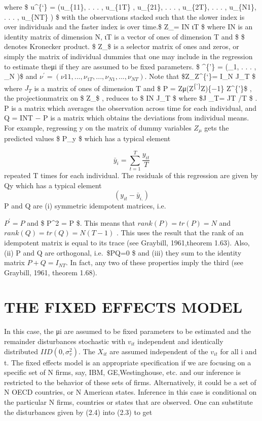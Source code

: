 \documentclass[
]{book}
\begin{document}
where \$ u\^{}\{`\} = (u\_\{11\}, . . . , u\_\{1T\} , u\_\{21\}, . . . , u\_\{2T\}, . . . , u\_\{N1\}, . . . , u\_\{NT\} ) \$ with the observations stacked such that the slower index is over individuals and the faster index is over time.\$ Z\_\mu = IN \otimes ιT \$ where IN is an identity matrix of dimension N, ιT is a vector of ones of dimension T and \$ \otimes \$ denotes Kronecker product. \$ Z\_\mu \$ is a selector matrix of ones and zeros, or simply the matrix of individual dummies that one may include in the regression to estimate theμi if they are assumed to be fixed parameters. \$ \mu\^{}\{'\} = (\mu\_1, . . . , \mu\_N )\$ and \(ν^{'} = (ν11, . . . , ν_{1T} , . . . , ν_{N1}, . . . , ν_{NT} )\). Note that \$Z\_\mu Z\^{}\{`\}\mu = I\_N \otimes J\_T \$ where \(J_T\) is a matrix of ones of dimension T and \$ P = Zμ(Z\textsuperscript{\{'\}}\mu Z\mu)\{−1\} Z\^{}\{'\}\mu \$ , the projectionmatrix on \$ Z\_\mu \$ , reduces to \$ IN \otimes J\_T \$ where \$J \_T= JT /T \$ . P is a matrix which averages the observation across time for each individual, and Q = INT − P is a matrix which obtains the deviations from individual means. For example, regressing y on the matrix of dummy variables \(Z_μ\) gets the predicted values \$ P\_y \$ which has a typical element

\[ \bar y_i = \sum_{t=1}^T \frac{y_{it}}{T}  \] repeated T times for each individual. The residuals of this regression are given by Qy which has a typical element \[ (y_{it} - \bar y _{i.} ) \] P and Q are (i) symmetric idempotent matrices, i.e.

\(P^{'} = P\) and \$ P\^{}2 = P \$. This means that \(rank(P) = tr(P) = N\) and \(rank(Q) = tr(Q) = N(T − 1)\) . This uses the result that the rank of an idempotent matrix is equal to its trace (see Graybill, 1961,theorem 1.63). Also, (ii) P and Q are orthogonal, i.e.~\$PQ=0 \$ and (iii) they sum to the identity matrix \(P + Q = I_{NT}\). In fact, any two of these properties imply the third (see Graybill, 1961, theorem 1.68).

\hypertarget{the-fixed-effects-model}{%
\section{THE FIXED EFFECTS MODEL}\label{the-fixed-effects-model}}

In this case, the μi are assumed to be fixed parameters to be estimated and the remainder disturbances stochastic with \(v_{it}\) independent and identically distributed \(IID(0,\sigma_v^2)\). The \(X_{it}\) are assumed independent of the \(v_{it}\) for all i and t. The fixed effects model is an appropriate specification if we are focusing on a specific set of N firms, say, IBM, GE,Westinghouse, etc. and our inference is restricted to the behavior of these sets of firms. Alternatively, it could be a set of N OECD countries, or N American states. Inference in this case is conditional on the particular N firms, countries or states that are observed. One can substitute the disturbances given by (2.4) into (2.3) to get
\end{document}
